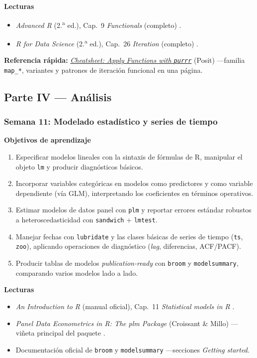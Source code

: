 \documentclass[11pt,letterpaper]{article}
\newcommand{\semana}[2]{%
  \subsubsection*{\color{main}Semana #1: #2}%
}
\newcommand{\cheatsheet}[2]{%
  \href{https://rstudio.github.io/cheatsheets/#1.pdf}{\textit{Cheatsheet: #2}}%
}
\begin{document}
\medskip
\noindent\textbf{Lecturas}
\begin{itemize}[leftmargin=*, itemsep=1pt]
    \item \textit{Advanced R} (2.\textsuperscript{a} ed.), Cap.\ 9 \textit{Functionals} (completo) \cite{wickham2019advr}.
    \item \textit{R for Data Science} (2.\textsuperscript{a} ed.), Cap.\ 26 \textit{Iteration} (completo) \cite{wickham2023r4ds}.
\end{itemize}

\medskip
\noindent\textbf{Referencia rápida:} \cheatsheet{purrr}{Apply Functions with \texttt{purrr}} (Posit) ---familia \texttt{map\_*}, variantes y patrones de iteración funcional en una página.

\subsection*{\color{main}Parte IV --- Análisis}

\semana{11}{Modelado estadístico y series de tiempo}

\medskip
\noindent\textbf{Objetivos de aprendizaje}
\begin{enumerate}[leftmargin=*, itemsep=1pt]
    \item Especificar modelos lineales con la sintaxis de fórmulas de R, manipular el objeto \texttt{lm} y producir diagnósticos básicos.
    \item Incorporar variables categóricas en modelos como predictores y como variable dependiente (vía GLM), interpretando los coeficientes en términos operativos.
    \item Estimar modelos de datos panel con \texttt{plm} y reportar errores estándar robustos a heteroscedasticidad con \texttt{sandwich} + \texttt{lmtest}.
    \item Manejar fechas con \texttt{lubridate} y las clases básicas de series de tiempo (\texttt{ts}, \texttt{zoo}), aplicando operaciones de diagnóstico (\textit{lag}, diferencias, ACF/PACF).
    \item Producir tablas de modelos \textit{publication-ready} con \texttt{broom} y \texttt{modelsummary}, comparando varios modelos lado a lado.
\end{enumerate}

\medskip
\noindent\textbf{Lecturas}
\begin{itemize}[leftmargin=*, itemsep=1pt]
    \item \textit{An Introduction to R} (manual oficial), Cap.\ 11 \textit{Statistical models in R} \cite{rcoreteam-intro}.
    \item \textit{Panel Data Econometrics in R: The plm Package} (Croissant \& Millo) ---viñeta principal del paquete \cite{croissant-plm}.
    \item Documentación oficial de \texttt{broom} \cite{robinson-broom} y \texttt{modelsummary} \cite{arelbundock-modelsummary} ---secciones \textit{Getting started}.
\end{itemize}
\end{document}
